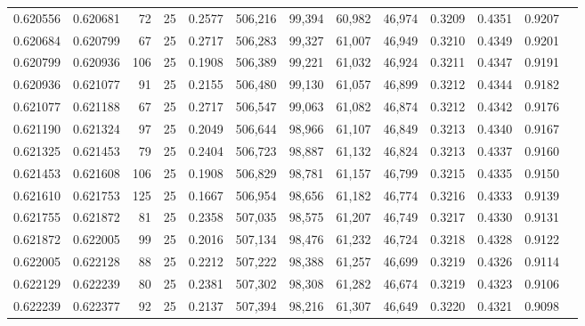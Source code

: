 \begin{tabular}{rrrrrrrrrrrrr}
0.620556 & 0.620681 &    72 &  25 &                                     0.2577 & 506,216 &  99,394 &  60,982 &  46,974 & 0.3209 & 0.4351 & 0.9207 \\
0.620684 & 0.620799 &    67 &  25 &                                     0.2717 & 506,283 &  99,327 &  61,007 &  46,949 & 0.3210 & 0.4349 & 0.9201 \\
0.620799 & 0.620936 &   106 &  25 &                                     0.1908 & 506,389 &  99,221 &  61,032 &  46,924 & 0.3211 & 0.4347 & 0.9191 \\
0.620936 & 0.621077 &    91 &  25 &                                     0.2155 & 506,480 &  99,130 &  61,057 &  46,899 & 0.3212 & 0.4344 & 0.9182 \\
0.621077 & 0.621188 &    67 &  25 &                                     0.2717 & 506,547 &  99,063 &  61,082 &  46,874 & 0.3212 & 0.4342 & 0.9176 \\
0.621190 & 0.621324 &    97 &  25 &                                     0.2049 & 506,644 &  98,966 &  61,107 &  46,849 & 0.3213 & 0.4340 & 0.9167 \\
0.621325 & 0.621453 &    79 &  25 &                                     0.2404 & 506,723 &  98,887 &  61,132 &  46,824 & 0.3213 & 0.4337 & 0.9160 \\
0.621453 & 0.621608 &   106 &  25 &                                     0.1908 & 506,829 &  98,781 &  61,157 &  46,799 & 0.3215 & 0.4335 & 0.9150 \\
0.621610 & 0.621753 &   125 &  25 &                                     0.1667 & 506,954 &  98,656 &  61,182 &  46,774 & 0.3216 & 0.4333 & 0.9139 \\
0.621755 & 0.621872 &    81 &  25 &                                     0.2358 & 507,035 &  98,575 &  61,207 &  46,749 & 0.3217 & 0.4330 & 0.9131 \\
0.621872 & 0.622005 &    99 &  25 &                                     0.2016 & 507,134 &  98,476 &  61,232 &  46,724 & 0.3218 & 0.4328 & 0.9122 \\
0.622005 & 0.622128 &    88 &  25 &                                     0.2212 & 507,222 &  98,388 &  61,257 &  46,699 & 0.3219 & 0.4326 & 0.9114 \\
0.622129 & 0.622239 &    80 &  25 &                                     0.2381 & 507,302 &  98,308 &  61,282 &  46,674 & 0.3219 & 0.4323 & 0.9106 \\
0.622239 & 0.622377 &    92 &  25 &                                     0.2137 & 507,394 &  98,216 &  61,307 &  46,649 & 0.3220 & 0.4321 & 0.9098 \\

\end{tabular}
